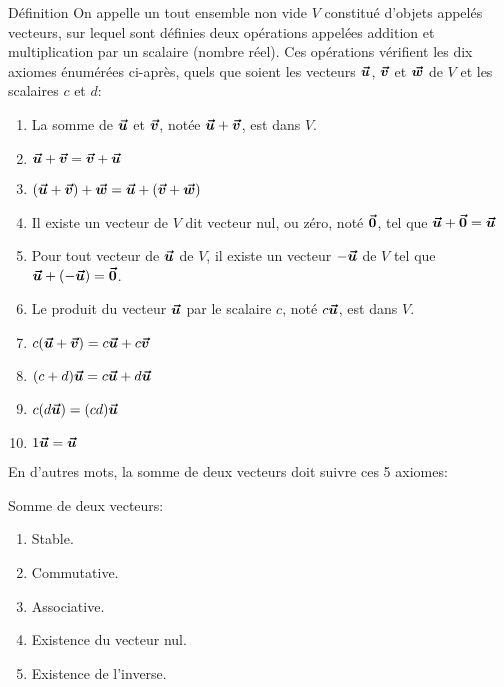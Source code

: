 \documentclass[a4paper]{article}
\begin{document}
\begin{parag}{Définition}
    On appelle un  tout ensemble non vide $V$ constitué d'objets appelés vecteurs, sur lequel sont définies deux opérations appelées addition et multiplication par un scalaire (nombre réel). Ces opérations vérifient les dix axiomes énumérées ci-après, quels que soient les vecteurs $\bm{\protect\vec{u}}$, $\bm{\protect\vec{v}}$ et $\bm{\protect\vec{w}}$ de $V$ et les scalaires $c$ et $d$:
    \begin{enumerate}
        \item La somme de $\bm{\protect\vec{u}}$ et $\bm{\protect\vec{v}}$, notée $\bm{\protect\vec{u}} + \bm{\protect\vec{v}}$, est dans $V$.
        \item $\bm{\protect\vec{u}} + \bm{\protect\vec{v}} = \bm{\protect\vec{v}} + \bm{\protect\vec{u}}$
        \item $\left(\bvec{u} + \bvec{v}\right) + \bvec{w} = \bvec{u} + \left(\bvec{v} + \bvec{w}\right)$
        \item Il existe un vecteur de $V$ dit vecteur nul, ou zéro, noté $\bm{\protect\vec{0}}$, tel que $\bm{\protect\vec{u}} + \bm{\protect\vec{0}} = \bm{\protect\vec{u}}$
        \item Pour tout vecteur de $\bm{\protect\vec{u}}$ de $V$, il existe un vecteur $-\bm{\protect\vec{u}}$ de $V$ tel que $\bvec{u} + \left(-\bvec{u}\right) = \bvec{0}$.
        \item Le produit du vecteur $\bm{\protect\vec{u}}$ par le scalaire $c$, noté $c \bm{\protect\vec{u}}$, est dans $V$.
        \item $c\left(\bvec{u} + \bvec{v}\right) = c \bvec{u} + c \bvec{v}$
        \item $\left(c + d\right)\bvec{u} = c \bvec{u} + d \bvec{u}$
        \item $c\left(d \bvec{u}\right) = \left(cd\right)\bvec{u}$
        \item $1 \bm{\protect\vec{u}} = \bm{\protect\vec{u}}$
    \end{enumerate}

    En d'autres mots, la somme de deux vecteurs doit suivre ces 5 axiomes:

    \begin{center}
    \begin{minipage}[t]{0.45\textwidth}\vspace{0pt}
    Somme de deux vecteurs:
    \begin{enumerate}
        \item Stable.
        \item Commutative.
        \item Associative.
        \item Existence du vecteur nul.
        \item Existence de l'inverse.
    \end{enumerate}


\end{minipage}
\end{center}
\end{parag}
\end{document}

